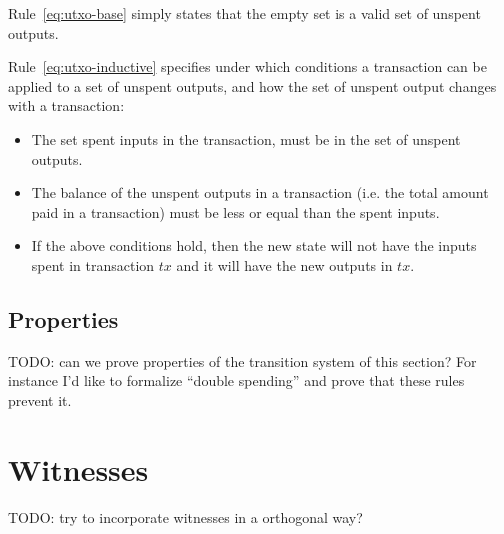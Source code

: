 \documentclass[11pt,a4paper]{article}
\newcommand{\var}[1]{\mathit{#1}}
\begin{document}
Rule~\ref{eq:utxo-base} simply states that the empty set is a valid set of
unspent outputs.

Rule~\ref{eq:utxo-inductive} specifies under which conditions a transaction can
be applied to a set of unspent outputs, and how the set of unspent output changes
with a transaction:
\begin{itemize}
\item The set spent inputs in the transaction, must be in the set of unspent
  outputs.
\item The balance of the unspent outputs in a transaction (i.e. the total
  amount paid in a transaction) must be less or equal than the spent
  inputs.
\item If the above conditions hold, then the new state will not have the inputs
  spent in transaction $\var{tx}$ and it will have the new outputs in
  $\var{tx}$.
\end{itemize}

\subsection{Properties}
\label{sec:utxo-properties}

TODO: can we prove properties of the transition system of this section? For
instance I'd like to formalize ``double spending'' and prove that these rules
prevent it.

\section{Witnesses}
\label{sec:witnesses}

TODO: try to incorporate witnesses in a orthogonal way?
\end{document}
